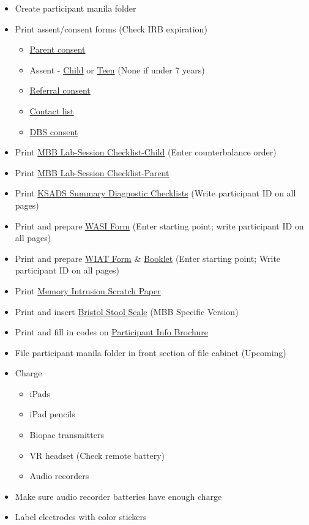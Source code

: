 \documentclass[]{book}
\providecommand{\tightlist}{%
  \setlength{\itemsep}{0pt}\setlength{\parskip}{0pt}}
\begin{document}
\begin{itemize}
\tightlist
\item
  Create participant manila folder
\item
  Print assent/consent forms (Check IRB expiration)

  \begin{itemize}
  \tightlist
  \item
    \href{https://app.box.com/file/630320519707}{Parent consent}
  \item
    Assent - \href{https://app.box.com/file/630320502379}{Child} or \href{https://app.box.com/file/630326888191}{Teen} (None if under 7 years)
  \item
    \href{https://app.box.com/file/630329099729}{Referral consent}
  \item
    \href{https://app.box.com/file/639652767665}{Contact list}
  \item
    \href{https://app.box.com/file/630326424318}{DBS consent}
  \end{itemize}
\item
  Print \href{https://app.box.com/file/630326484181}{MBB Lab-Session Checklist-Child} (Enter counterbalance order)
\item
  Print \href{https://app.box.com/file/630325295018}{MBB Lab-Session Checklist-Parent}
\item
  Print \href{https://app.box.com/file/630326477910}{KSADS Summary Diagnostic Checklists} (Write participant ID on all pages)
\item
  Print and prepare \href{https://app.box.com/file/630326463909}{WASI Form} (Enter starting point; write participant ID on all pages)
\item
  Print and prepare \href{https://app.box.com/file/630318060264}{WIAT Form} \& \href{https://app.box.com/file/630326404817}{Booklet} (Enter starting point; Write participant ID on all pages)
\item
  Print \href{https://app.box.com/file/630322810250}{Memory Intrusion Scratch Paper}
\item
  Print and insert \href{https://app.box.com/file/630326499609}{Bristol Stool Scale} (MBB Specific Version)
\item
  Print and fill in codes on \href{https://app.box.com/file/630317204624}{Participant Info Brochure}
\item
  File participant manila folder in front section of file cabinet (Upcoming)
\item
  Charge

  \begin{itemize}
  \tightlist
  \item
    iPads
  \item
    iPad pencils
  \item
    Biopac transmitters
  \item
    VR headset (Check remote battery)
  \item
    Audio recorders
  \end{itemize}
\item
  Make sure audio recorder batteries have enough charge
\item
  Label electrodes with color stickers


\end{itemize}
\end{document}
